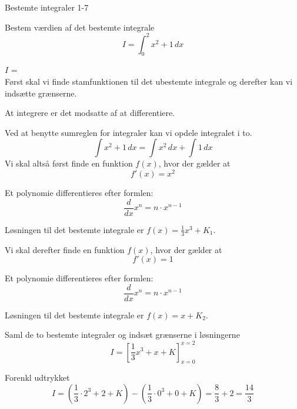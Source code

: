 \documentclass{article}
\begin{document}
\newpage

\begin{exercise}{Bestemte integraler 1-7}
	
	Bestem værdien af det bestemte integrale
	\[
	I = \int_0^2 x^2+1 \, dx
	\]
	
	$I$ =  \\
	
	
	\hint
	Først skal vi finde stamfunktionen til det ubestemte integrale og derefter kan vi indsætte grænserne.
	
	\hint
	At integrere er det modsatte af at differentiere.
	
	\hint
	
	Ved at benytte sumreglen for integraler kan vi opdele integralet i to.
	\[
	\int x^2+ 1 \, dx = \int x^2 \,dx + \int 1 \, dx
	\]
	\hint
	Vi skal altså først finde en funktion $f(x)$, hvor der gælder at
	\[
	f'(x) = x^2
	\]
	
	\hint
	Et polynomie differentieres efter formlen:
	\[
	\frac{d}{dx} x^n = n \cdot x^{n - 1}
	\]
	
	\hint
	Løsningen til det bestemte integrale er $f(x) = \frac{1}{3} x^3 + K_1$.
		
	\hint
	Vi skal  derefter finde en funktion $f(x)$, hvor der gælder at
	\[
	f'(x) = 1
	\]
	
	\hint
	Et polynomie differentieres efter formlen:
	\[
	\frac{d}{dx} x^n = n \cdot x^{n - 1}
	\]
	
	\hint
	Løsningen til det bestemte integrale er $f(x) = x + K_2$.
	
	
	
	\hint
	Saml de to bestemte integraler og indsæt grænserne i løsningerne
	\[
	I = \left[ \frac{1}{3} x^3 + x + K \right]_{x=0}^{x=2}
	\]
	
	\hint
	Forenkl udtrykket
	\[
	I = \left( \frac{1}{3} \cdot 2^3 + 2+ K \right) - \left( \frac{1}{3} \cdot 0^3 + 0 + K \right) = \frac{8}{3} + 2 = \frac{14}{3}
	\]
	
	
\end{exercise}

\newpage
\end{document}
